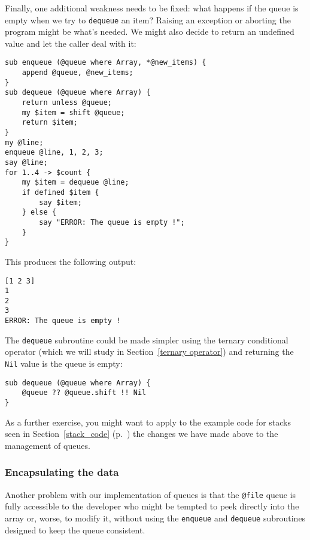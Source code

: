Finally, one additional weakness needs to be fixed: what 
happens if the queue is empty when we try to {\tt dequeue} 
an item? Raising an exception or aborting the program 
might be what's needed. We might also decide to return an 
undefined value and let the caller deal with it:

\begin{verbatim}
sub enqueue (@queue where Array, *@new_items) {
    append @queue, @new_items;
}
sub dequeue (@queue where Array) {
    return unless @queue;
    my $item = shift @queue;
    return $item;
}
my @line;
enqueue @line, 1, 2, 3;
say @line;
for 1..4 -> $count {
    my $item = dequeue @line;
    if defined $item {
        say $item;
    } else {
        say "ERROR: The queue is empty !";
    }
}
\end{verbatim}

This produces the following output:

\begin{verbatim}
[1 2 3]
1
2
3
ERROR: The queue is empty !
\end{verbatim}

The {\tt dequeue} subroutine could be made simpler using 
the ternary conditional operator (which we will study in 
Section~\ref{ternary operator}) and returning the {\tt Nil} 
value is the queue is empty:

\begin{verbatim}
sub dequeue (@queue where Array) {
    @queue ?? @queue.shift !! Nil
}
\end{verbatim}


As a further exercise, you might want to apply to the 
example code for stacks seen in Section~\ref{stack_code} 
(p.~\pageref{stack_code}) the changes we have made 
above to the management of queues.

\subsubsection{Encapsulating the data}
\label{functional_queue}

Another problem with our implementation of queues is that 
the \verb'@file' queue is fully accessible to the developer 
who might be tempted to peek directly into the array or, 
worse, to modify it, without using the {\tt enqueue} and 
{\tt dequeue} subroutines designed to keep the queue 
consistent. 

